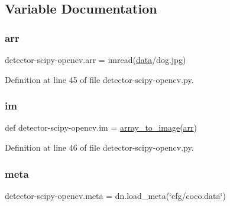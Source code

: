 \subsection{Variable Documentation}
\mbox{\label{namespacedetector-scipy-opencv_a0472a36e7499b02302910f8ab212facb}} 
\subsubsection{\texorpdfstring{arr}{arr}}
{\footnotesize\ttfamily detector-\/scipy-\/opencv.\+arr = imread(\textquotesingle{}\mbox{\hyperlink{structdata}{data}}/dog.\+jpg\textquotesingle{})}



Definition at line 45 of file detector-\/scipy-\/opencv.\+py.

\mbox{\label{namespacedetector-scipy-opencv_a5f732f155542b878160190ca2240d4db}} 
\subsubsection{\texorpdfstring{im}{im}}
{\footnotesize\ttfamily def detector-\/scipy-\/opencv.\+im = \mbox{\hyperlink{namespacedetector-scipy-opencv_a21af42bac0599affdd209fb7ad6ace05}{array\+\_\+to\+\_\+image}}(\mbox{\hyperlink{namespacedetector-scipy-opencv_a0472a36e7499b02302910f8ab212facb}{arr}})}



Definition at line 46 of file detector-\/scipy-\/opencv.\+py.

\mbox{\label{namespacedetector-scipy-opencv_aefa8c13d2324512c8b50817683901197}} 
\subsubsection{\texorpdfstring{meta}{meta}}
{\footnotesize\ttfamily detector-\/scipy-\/opencv.\+meta = dn.\+load\+\_\+meta(\char`\"{}cfg/coco.\+data\char`\"{})}



